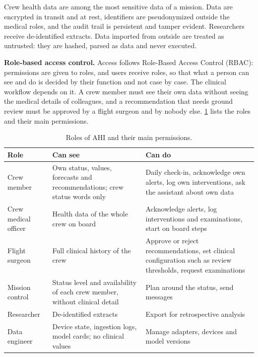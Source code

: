 Crew health data are among the most sensitive data of a mission. Data are encrypted in transit and at rest, identifiers are pseudonymized outside the medical roles, and the audit trail is persistent and tamper evident. Researchers receive de-identified extracts. Data imported from outside are treated as untrusted: they are hashed, parsed as data and never executed.

\medskip\noindent\textbf{Role-based access control.} Access follows Role-Based Access Control (RBAC): permissions are given to roles, and users receive roles, so that what a person can see and do is decided by their function and not case by case. The clinical workflow depends on it. A crew member must see their own data without seeing the medical details of colleagues, and a recommendation that needs ground review must be approved by a flight surgeon and by nobody else. \ref{tab:rbac} lists the roles and their main permissions.

\begin{table}[htbp]
\centering
\vspace{0.8em}
\caption{Roles of AHI and their main permissions.}
\label{tab:rbac}
\footnotesize
\begin{tabular}{p{2.8cm}p{5.2cm}p{6.0cm}}
\hline
\textbf{Role} & \textbf{Can see} & \textbf{Can do} \\
\hline
Crew member & Own status, values, forecasts and recommendations; crew status words only & Daily check-in, acknowledge own alerts, log own interventions, ask the assistant about own data \\
Crew medical officer & Health data of the whole crew on board & Acknowledge alerts, log interventions and examinations, start on board steps \\
Flight surgeon & Full clinical history of the crew & Approve or reject recommendations, set clinical configuration such as review thresholds, request examinations \\
Mission control & Status level and availability of each crew member, without clinical detail & Plan around the status, send messages \\
Researcher & De-identified extracts & Export for retrospective analysis \\
Data engineer & Device state, ingestion logs, model cards; no clinical values & Manage adapters, devices and model versions \\
\hline
\end{tabular}
\vspace{1.2em}
\end{table}

